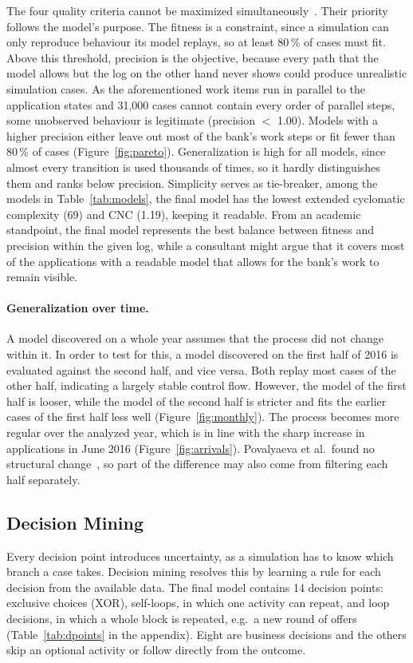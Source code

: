 \documentclass[
  english,        %
  font=times,     %
  twocolumn,      %
]{tumarticle}
\begin{document}
The four quality criteria cannot be maximized simultaneously~\cite{vanderaalst2016}. Their priority follows the model's purpose. The fitness is a constraint, since a simulation can only reproduce behaviour its model replays, so at least 80\,\% of cases must fit. Above this threshold, precision is the objective, because every path that the model allows but the log on the other hand never shows could produce unrealistic simulation cases. As the aforementioned work items run in parallel to the application states and 31,000 cases cannot contain every order of parallel steps, some unobserved behaviour is legitimate (precision $<$ 1.00). Models with a higher precision either leave out most of the bank's work steps or fit fewer than 80\,\% of cases (Figure~\ref{fig:pareto}). Generalization is high for all models, since almost every transition is used thousands of times, so it hardly distinguishes them and ranks below precision. Simplicity serves as tie-breaker, among the models in Table~\ref{tab:models},
the final model has the lowest extended cyclomatic complexity (69) and CNC
(1.19), keeping it readable. From an academic standpoint, the final model represents the best balance between fitness and precision within the given log, while a consultant might argue that it covers most of the applications with a readable model that allows for the bank's work to remain visible. 

\paragraph{Generalization over time.}
A model discovered on a whole year assumes that the process did not change within it. In order to test for this, a model discovered on the first half of 2016 is evaluated against the second half, and vice versa. Both replay most cases of the other half, indicating a largely stable control flow. However, the model of the first half is looser, while the model of the second half is stricter and fits the earlier cases of the first half less well (Figure~\ref{fig:monthly}). The process becomes more regular over the analyzed year, which is in line with the sharp increase in applications in June 2016 (Figure~\ref{fig:arrivals}). Povalyaeva et al.\ found no structural change~\cite{povalyaeva2017density}, so part of the difference may also come from filtering each half separately.

\subsection{Decision Mining}\label{sec:dm}
Every decision point introduces uncertainty, as a simulation has to know which branch a case takes. Decision mining resolves this by learning a rule for each decision from the available data. The final model contains 14 decision points: exclusive choices (XOR), self-loops, in which one activity can repeat, and loop decisions, in which a whole block is repeated, e.g.\ a new round of offers (Table~\ref{tab:dpoints} in the appendix). Eight are business decisions and the others skip an optional activity or follow directly from the outcome.
\end{document}
